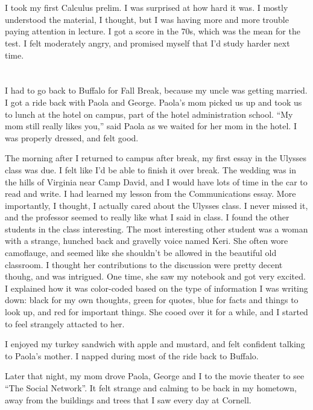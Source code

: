 \section{}

I took my first Calculus prelim.  I was surprised at how hard it was.  I mostly
understood the material, I thought, but I was having more and more trouble
paying attention in lecture.  I got a score in the 70s, which was the mean for
the test.  I felt moderately angry, and promised myself that I'd study harder
next time.

\section{}

I had to go back to Buffalo for Fall Break, because my uncle was getting
married.  I got a ride back with Paola and George.  Paola's mom picked us up and
took us to lunch at the hotel on campus, part of the hotel administration
school.  ``My mom still really likes you,'' said Paola as we waited for her mom
in the hotel.  I was properly dressed, and felt good.  

The morning after I returned to campus after break, my first essay in the
Ulysses class was due.  I felt like I'd be able to finish it over break.  The
wedding was in the hills of Virginia near Camp David, and I would have lots of
time in the car to read and write.  I had learned my lesson from the
Communications essay.  More importantly, I thought, I actually cared about the
Ulysses class.  I never missed it, and the professor seemed to really like what
I said in class.  I found the other students in the class interesting.  The most
interesting other student was a woman with a strange, hunched back and gravelly
voice named Keri.  She often wore camoflauge, and seemed like she shouldn't be
allowed in the beautiful old classroom.  I thought her contributions to the
discussion were pretty decent thouhg, and was intrigued.  One time, she saw my
notebook and got very excited.  I explained how it was color-coded based on the
type of information I was writing down: black for my own thoughts, green for
quotes, blue for facts and things to look up, and red for important things.  She
cooed over it for a while, and I started to feel strangely attacted to her.

I enjoyed my turkey sandwich with apple and mustard, and felt confident talking
to Paola's mother.  I napped during most of the ride back to Buffalo.  

Later that night, my mom drove Paola, George and I to the movie theater to see
``The Social Network''.  It felt strange and calming to be back in my hometown,
away from the buildings and trees that I saw every day at Cornell.  

